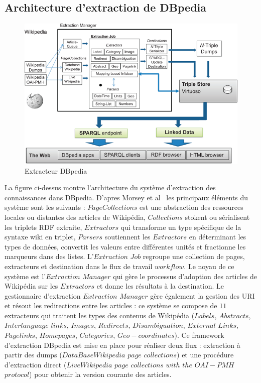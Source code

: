 \documentclass[12pt,a4	]{report}
\begin{document}
\subsection*{Architecture d'extraction de DBpedia}
\begin{figure}[H]
\centering
\includegraphics[width=12cm]{dbpediaExtra.png}
\caption{Extracteur DBpedia}
\end{figure}
La figure ci-dessus montre l'architecture du système d'extraction des connaissances dans DBpedia.
D'apres Morsey et al~\cite{morsey2012} les principaux éléments du système sont les suivants : $PageCollections$ est une abstraction des ressources locales ou distantes des articles de Wikipédia, $Collections$ stokent ou sérialisent les triplets RDF extraite, $Extractors$ qui transforme un type spécifique de la syntaxe wiki en triplet, $Parsers$ soutiennent les $Extractors$ en déterminant les types de données, convertit les valeurs entre différentes unités et fractionne les marqueurs dans des listes. L'$Extraction$ $Job$ regroupe une collection de pages, extracteurs et destination dans le flux de travail $workflow$.
Le noyau de ce système est l'$Extraction$ $Manager$ qui gère le processus  d'adoption des articles de Wikipédia sur les $Extractors$ et donne les résultats à la destination.
Le gestionnaire d'extraction $Extraction$ $Manager$ gère également la gestion des URI et résout les redirections entre les articles : ce système se compose de $11$ extracteurs qui traitent les types des contenus de Wikipédia ($Labels$, $Abstracts$, $Interlanguage$ $links$, $Images$, $Redirects$, $Disambiguation$,
$External$ $Links$, $Pagelinks$, $Homepages$, $Categories$, $Geo-coordinates$).
Ce framework d'extraction DBpedia est mise en place pour réaliser deux flux : extraction à partir des dumps ($DataBaseWikipedia$ $page$ $collections$) et une procédure d'extraction direct
($LiveWikipedia$ $page$ $collections$ $with$ $the$ $OAI-PMH$ $protocol$) pour obtenir la version courante des articles.
\end{document}
